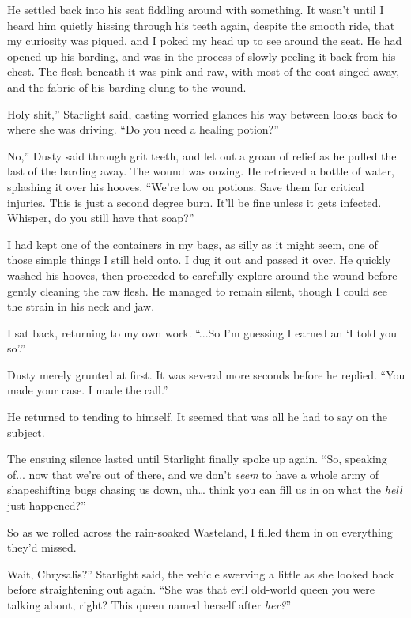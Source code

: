 He settled back into his seat fiddling around with something. It wasn’t until I heard him quietly hissing through his teeth again, despite the smooth ride, that my curiosity was piqued, and I poked my head up to see around the seat. He had opened up his barding, and was in the process of slowly peeling it back from his chest. The flesh beneath it was pink and raw, with most of the coat singed away, and the fabric of his barding clung to the wound.

\leavevmode{}Holy shit,” Starlight said, casting worried glances his way between looks back to where she was driving. “Do you need a healing potion?”

\leavevmode{}No,” Dusty said through grit teeth, and let out a groan of relief as he pulled the last of the barding away. The wound was oozing. He retrieved a bottle of water, splashing it over his hooves. “We’re low on potions. Save them for critical injuries. This is just a second degree burn. It’ll be fine unless it gets infected. Whisper, do you still have that soap?”

I had kept one of the containers in my bags, as silly as it might seem, one of those simple things I still held onto. I dug it out and passed it over. He quickly washed his hooves, then proceeded to carefully explore around the wound before gently cleaning the raw flesh. He managed to remain silent, though I could see the strain in his neck and jaw.

I sat back, returning to my own work. “...So I’m guessing I earned an ‘I told you so’.”

Dusty merely grunted at first. It was several more seconds before he replied. “You made your case. I made the call.”

He returned to tending to himself. It seemed that was all he had to say on the subject.

The ensuing silence lasted until Starlight finally spoke up again. “So, speaking of... now that we’re out of there, and we don’t \textit{seem} to have a whole army of shapeshifting bugs chasing us down, uh… think you can fill us in on what the \textit{hell} just happened?”

So as we rolled across the rain-soaked Wasteland, I filled them in on everything they’d missed.

\leavevmode{}Wait, Chrysalis?” Starlight said, the vehicle swerving a little as she looked back before straightening out again. “She was that evil old-world queen you were talking about, right? This queen named herself after \textit{her?}”

